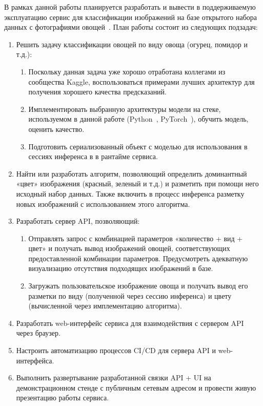 \documentclass[a4paper,12pt]{extarticle}
\begin{document}
В рамках данной работы планируется разработать и вывести в поддерживаемую эксплуатацию сервис для
классификации изображений на базе открытого набора данных с фотографиями овощей~\cite{dataset}. План
работы состоит из следующих подзадач:

\begin{enumerate}
	\item Решить задачу классификации овощей по виду овоща (огурец, помидор и т.д.):
	\begin{enumerate}
		\item Поскольку данная задача уже хорошо отработана коллегами из сообщества Kaggle,
		воспользоваться примерами лучших архитектур для получения хорошего качества предсказаний.
		\item Имплементировать выбранную архитектуры модели на стеке, используемом в
		данной работе (Python~\cite{python}, PyTorch~\cite{pytorch}), обучить модель, оценить качество.
		\item Подготовить сериализованный объект с моделью для использования в сессиях инференса в
		в рантайме сервиса.
	\end{enumerate}
	\item Найти или разработать алгоритм, позволяющий определить доминантный «цвет» изображения
	(красный, зеленый и т.д.) и разметить при помощи него исходный набор данных. Также включить в
	процесс инференса разметку новых изображений с использованием этого алгоритма.
	\item Разработать сервер API, позволяющий:
	\begin{enumerate}
		\item Отправлять запрос с комбинацией параметров «количество + вид + цвет» и получать вывод
		изображений овощей, соответствующих предоставленной комбинации параметров. Предусмотреть
		адекватную визуализацию отсутствия подходящих изображений в базе.
		\item Загружать пользовательское изображение овоща и получать вывод его разметки по виду
		(полученной через сессию инференса) и цвету (вычисленной через имплементацию алгоритма).
	\end{enumerate}
	\item Разработать web-интерфейс сервиса для взаимодействия с сервером API через браузер.
	\item Настроить автоматизацию процессов CI/CD для сервера API и web-интерфейса.
	\item Выполнить развертывание разработанной связки API + UI на демонстрационном стенде с
	публичным сетевым адресом и провести живую презентацию работы сервиса.
\end{enumerate}
\end{document}
